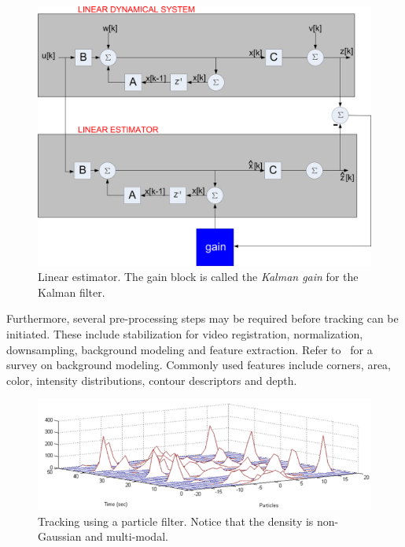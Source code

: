 \begin{Body}
								\begin{figure}[t]
								\center
								\includegraphics[width=1.0\textwidth]{thesis/TRK_LinearEstimator_blockDiagram.pdf}
								\caption{Linear estimator.  The gain block is called the \emph{Kalman gain} for the Kalman filter.}
								\label{TRK_overviewDiagram}
								\end{figure}

Furthermore, several pre-processing steps may be required before tracking can be initiated.  These include stabilization for video registration, normalization, downsampling, background modeling and feature extraction.  Refer to~\cite{1999_CNF_Wallflower_Toyama} for a survey on background modeling. Commonly used features include corners, area, color, intensity distributions, contour descriptors and depth.

								\begin{figure}[t]
								\center
								\includegraphics[width=1.0\textwidth]{thesis/TRK_ParticleFilter_multimodalPDF_part.png}
								\caption{Tracking using a particle filter.  Notice that the density is non-Gaussian and multi-modal.}
								\label{fig:particle_filter_multi_modal_density}
								\end{figure}




\end{Body}
